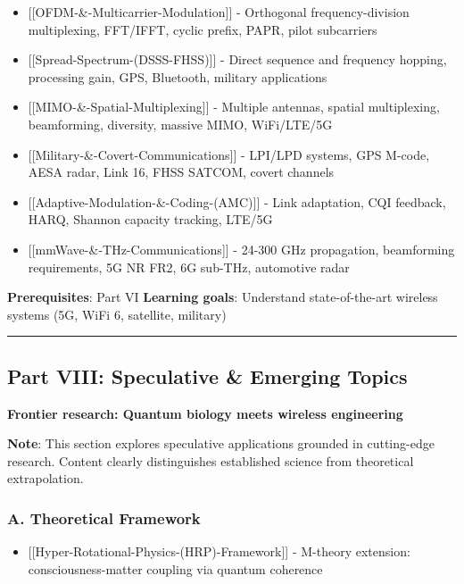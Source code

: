 \begin{itemize}
\tightlist
\item
  {[}{[}OFDM-\&-Multicarrier-Modulation{]}{]} - Orthogonal
  frequency-division multiplexing, FFT/IFFT, cyclic prefix, PAPR, pilot
  subcarriers
\item
  {[}{[}Spread-Spectrum-(DSSS-FHSS){]}{]} - Direct sequence and
  frequency hopping, processing gain, GPS, Bluetooth, military
  applications
\item
  {[}{[}MIMO-\&-Spatial-Multiplexing{]}{]} - Multiple antennas, spatial
  multiplexing, beamforming, diversity, massive MIMO, WiFi/LTE/5G
\item
  {[}{[}Military-\&-Covert-Communications{]}{]} - LPI/LPD systems, GPS
  M-code, AESA radar, Link 16, FHSS SATCOM, covert channels
\item
  {[}{[}Adaptive-Modulation-\&-Coding-(AMC){]}{]} - Link adaptation, CQI
  feedback, HARQ, Shannon capacity tracking, LTE/5G
\item
  {[}{[}mmWave-\&-THz-Communications{]}{]} - 24-300 GHz propagation,
  beamforming requirements, 5G NR FR2, 6G sub-THz, automotive radar
\end{itemize}

\textbf{Prerequisites}: Part VI \textbf{Learning goals}: Understand
state-of-the-art wireless systems (5G, WiFi 6, satellite, military)

\begin{center}\rule{0.5\linewidth}{0.5pt}\end{center}

\subsection{\texorpdfstring{ Part VIII: Speculative \& Emerging
Topics}{ Part VIII: Speculative \& Emerging Topics}}\label{part-viii-speculative-emerging-topics}

\textbf{Frontier research: Quantum biology meets wireless engineering}

\textbf{Note}: This section explores speculative applications grounded
in cutting-edge research. Content clearly distinguishes established
science from theoretical extrapolation.

\subsubsection{A. Theoretical Framework}\label{a.-theoretical-framework}

\begin{itemize}
\tightlist
\item
  {[}{[}Hyper-Rotational-Physics-(HRP)-Framework{]}{]} - M-theory
  extension: consciousness-matter coupling via quantum coherence
\end{itemize}

